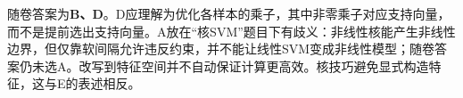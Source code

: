 随卷答案为\textbf{B、D}。D应理解为优化各样本的乘子，其中非零乘子对应支持向量，而不是提前选出支持向量。A放在“核SVM”题目下有歧义：非线性核能产生非线性边界，但仅靠软间隔允许违反约束，并不能让线性SVM变成非线性模型；随卷答案仍未选A。改写到特征空间并不自动保证计算更高效。核技巧避免显式构造特征，这与E的表述相反。
